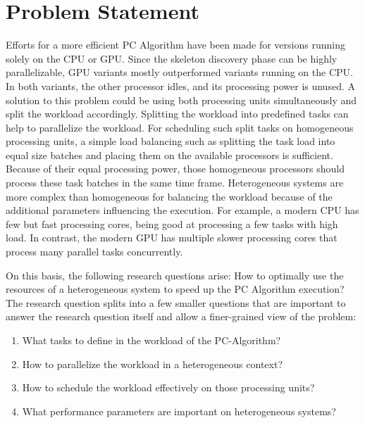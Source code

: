 \chapter{Problem Statement}
Efforts for a more efficient PC Algorithm have been made for versions running solely on the CPU or GPU. Since the skeleton discovery phase can be highly parallelizable, GPU variants mostly outperformed variants running on the CPU. In both variants, the other processor idles, and its processing power is unused. A solution to this problem could be using both processing units simultaneously and split the workload accordingly.
Splitting the workload into predefined tasks can help to parallelize the workload. For scheduling such split tasks on homogeneous processing units, a simple load balancing such as splitting the task load into equal size batches and placing them on the available processors is sufficient.
Because of their equal processing power, those homogeneous processors should process these task batches in the same time frame.
Heterogeneous systems are more complex than homogeneous for balancing the workload because of the additional parameters influencing the execution. For example, a modern CPU has few but fast processing cores, being good at processing a few tasks with high load. In contrast, the modern GPU has multiple slower processing cores that process many parallel tasks concurrently.

On this basis, the following research questions arise: How to optimally use the resources of a heterogeneous system to speed up the PC Algorithm execution?
The research question splits into a few smaller questions that are important to answer the research question itself and allow a finer-grained view of the problem:

\begin{enumerate}
  \item What tasks to define in the workload of the PC-Algorithm?
  \item How to parallelize the workload in a heterogeneous context?
  \item How to schedule the workload effectively on those processing units?
  \item What performance parameters are important on heterogeneous systems?
\end{enumerate}

